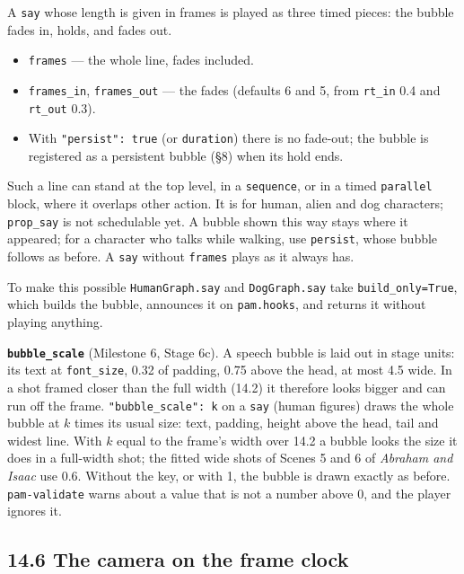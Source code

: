 \documentclass[
  12pt,
  letterpaper,
]{book}
\providecommand{\tightlist}{%
  \setlength{\itemsep}{0pt}\setlength{\parskip}{0pt}}
\begin{document}
A \texttt{say} whose length is given in frames is played as three timed
pieces: the bubble fades in, holds, and fades out.

\begin{itemize}
\tightlist
\item
  \texttt{frames} --- the whole line, fades included.
\item
  \texttt{frames\_in}, \texttt{frames\_out} --- the fades (defaults 6
  and 5, from \texttt{rt\_in} 0.4 and \texttt{rt\_out} 0.3).
\item
  With \texttt{"persist": true} (or \texttt{duration}) there is no
  fade-out; the bubble is registered as a persistent bubble (\S8) when
  its hold ends.
\end{itemize}

Such a line can stand at the top level, in a \texttt{sequence}, or in a
timed \texttt{parallel} block, where it overlaps other action. It is
for human, alien and dog characters; \texttt{prop\_say} is not
schedulable yet. A bubble shown this way stays where it appeared; for
a character who talks while walking, use \texttt{persist}, whose bubble
follows as before. A \texttt{say} without \texttt{frames} plays as it
always has.

To make this possible \texttt{HumanGraph.say} and \texttt{DogGraph.say}
take \texttt{build\_only=True}, which builds the bubble, announces it
on \texttt{pam.hooks}, and returns it without playing anything.

\textbf{\texttt{bubble\_scale}}
(Milestone 6, Stage 6c). A speech bubble is laid out in stage units:
its text at \texttt{font\_size}, 0.32 of padding, 0.75 above the head,
at most 4.5 wide. In a shot framed closer than the full width (14.2) it
therefore looks bigger and can run off the frame. \texttt{"bubble\_scale":
k} on a \texttt{say} (human figures) draws the whole bubble at
\(k\) times its usual size: text, padding, height above the head, tail
and widest line. With \(k\) equal to the frame's width over 14.2 a
bubble looks the size it does in a full-width shot; the fitted wide
shots of Scenes 5 and 6 of \emph{Abraham and Isaac} use 0.6. Without
the key, or with 1, the bubble is drawn exactly as before.
\texttt{pam-validate} warns about a value that is not a number above 0,
and the player ignores it.

\subsection{14.6 The camera on the frame clock}\label{camera-on-the-frame-clock}
\end{document}
